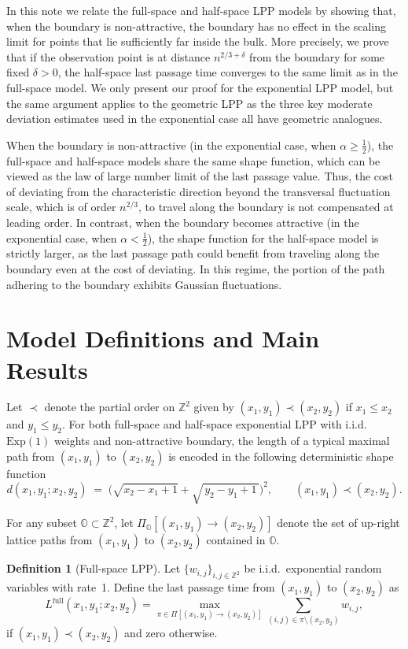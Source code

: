 \documentclass[11pt]{article}
\theoremstyle{definition}
\newtheorem{definition}[theorem]{Definition}
\newcommand{\Z}{\mathbb{Z}}
\newcommand{\OO}{\mathbb{O}}
\newcommand{\Lfull}{L^{\mathrm{full}}}
\begin{document}
In this note we relate the full-space and half-space LPP models by showing that, when the boundary is non-attractive, the boundary has no effect in the scaling limit for points that lie sufficiently far inside the bulk. More precisely, we prove that if the observation point is at distance $n^{2/3+\delta}$ from the boundary for some fixed $\delta>0$, the half-space last passage time converges to the same limit as in the full-space model. We only present our proof for the exponential LPP model, but the same argument applies to the geometric LPP as the three key moderate deviation estimates used in the exponential case all have geometric analogues.

When the boundary is non-attractive (in the exponential case, when $\alpha \ge \tfrac{1}{2}$), the full-space and half-space models share the same shape function, which can be viewed as the law of large number limit of the last passage value. Thus, the cost of deviating from the characteristic direction beyond the transversal fluctuation scale, which is of order $n^{2/3}$, to travel along the boundary is not compensated at leading order. In contrast, when the boundary becomes attractive (in the exponential case, when $\alpha < \tfrac{1}{2}$), the shape function for the half-space model is strictly larger, as the last passage path could benefit from traveling along the boundary even at the cost of deviating. In this regime, the portion of the path adhering to the boundary exhibits Gaussian fluctuations.

\section{Model Definitions and Main Results}
\label{sec:model}
Let $\prec$ denote the partial order on $\Z^2$ given by
$(x_1,y_1)\prec(x_2,y_2)$ if $x_1\le x_2$ and $y_1\le y_2$.
For both full-space and half-space exponential LPP with i.i.d.\ $\mathrm{Exp}(1)$ weights and non-attractive boundary, the length of a typical maximal path from $(x_1,y_1)$ to $(x_2,y_2)$ is encoded in the following deterministic shape function 
\[
d(x_1,y_1;x_2,y_2)
\;=\;\big(\sqrt{x_2-x_1+1}+\sqrt{\,y_2-y_1+1\,}\big)^2,
\qquad (x_1,y_1)\prec(x_2,y_2).
\]



For any subset $\OO \subset \Z^2$, let $\Pi_{\OO}[(x_1,y_1) \rightarrow (x_2,y_2)]$ denote the set of up-right lattice paths from $(x_1, y_1)$ to $(x_2,y_2)$ contained in $\OO$.

\begin{definition}[Full-space LPP]
Let $\{w_{i,j}\}_{i,j \in \Z^2}$ be i.i.d.\ exponential random variables with rate~1.  
Define the last passage time from $(x_1,y_1)$ to $(x_2,y_2)$ as
\[
\Lfull(x_1,y_1;x_2,y_2) = \max_{\pi \in \Pi[(x_1,y_1)\to(x_2,y_2)]} \sum_{(i,j)\in\pi \setminus (x_2,y_2)} w_{i,j},
\]
if $(x_1, y_1) \prec (x_2,y_2)$ and zero otherwise.
\end{definition}
\end{document}
